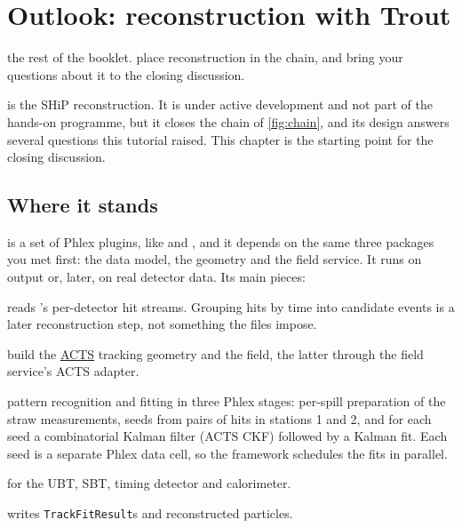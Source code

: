 \chapter{Outlook: reconstruction with Trout}
\label{ch:outlook}

{the rest of the booklet.}
{place reconstruction in the chain, and bring your questions about it to the closing discussion.}

 is the SHiP reconstruction. It is under active development and
not part of the hands-on programme, but it closes the chain of
\cref{fig:chain}, and its design answers several questions this tutorial
raised. This chapter is the starting point for the closing discussion.

\section{Where it stands}

 is a set of Phlex plugins, like  and , and
it depends on the same three packages you met first: the data model, the
geometry and the field service. It runs on  output or, later, on
real detector data. Its main pieces:

\begin{description}[style=nextline]
  \item[\texttt{read\_digitised\_hits}] reads 's per-detector hit
    streams. Grouping hits by time into candidate events is a later
    reconstruction step, not something the files impose.
  \item[\texttt{acts\_geometry\_provider}, \texttt{acts\_field\_provider}]
    build the \href{https://acts.readthedocs.io}{ACTS} tracking geometry and
    the field, the latter through the field service's ACTS adapter.
  \item[\texttt{spectrometer\_tracking}] pattern recognition and fitting in
    three Phlex stages: per-spill preparation of the straw measurements,
    seeds from pairs of hits in stations 1 and 2, and for each seed a
    combinatorial Kalman filter (ACTS CKF) followed by a Kalman fit. Each seed
    is a separate Phlex data cell, so the framework schedules the fits in
    parallel.
  \item[detector modules] for the UBT, SBT, timing detector and calorimeter.
  \item[\texttt{rec\_output\_module}] writes \texttt{TrackFitResult}s and
    reconstructed particles.
\end{description}

